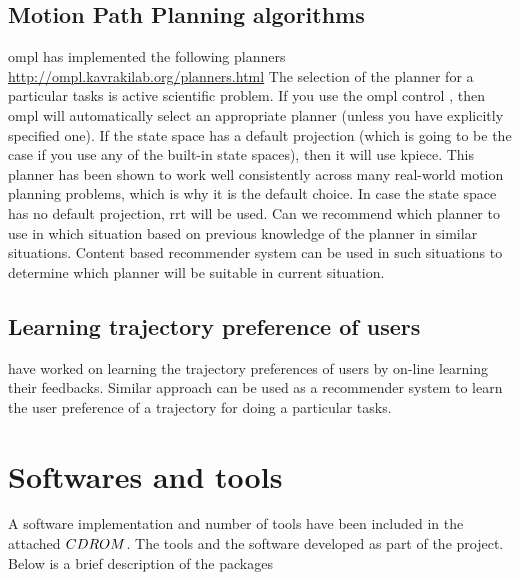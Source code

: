 \subsection{Motion Path Planning algorithms }
\acrfull{ompl} has implemented the following planners \url{http://ompl.kavrakilab.org/planners.html}
The selection of the planner for a particular tasks is active scientific 
problem.
If you use the \acrshort{ompl} control , then \acrshort{ompl} will automatically select an
appropriate planner (unless you have explicitly specified one).
If the state
space has a default projection (which is going to be the case if you use any of
the built-in state spaces), then it will use \acrfull{kpiece}. This planner has been
shown to work well consistently across many real-world motion planning
problems, which is why it is the default choice.
In case the state space has no
default projection, \acrfull{rrt} will be used. 
Can we recommend which planner to use in which situation based on previous 
knowledge of the planner in similar situations.
Content based recommender system can be used in such situations to determine 
which planner will be suitable in current situation.

\subsection{Learning trajectory preference of users}
\cite{jain_learning_2013} have worked on learning the trajectory preferences 
of users by on-line learning their feedbacks.
Similar approach can be used as a recommender system to learn 
the user preference of a trajectory for doing a particular tasks.

\newpage
\section{Softwares and tools}

A software implementation and number of tools have been included in the attached
$CD\-ROM$. The tools and the software developed as part of the project.
Below is a brief description of the packages

